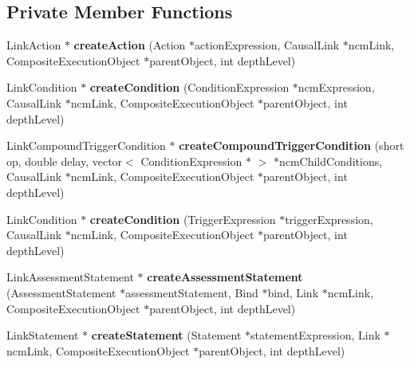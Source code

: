 \subsection*{Private Member Functions}
\begin{CompactItemize}
\item 
LinkAction $\ast$ \textbf{createAction} (Action $\ast$actionExpression, CausalLink $\ast$ncmLink, CompositeExecutionObject $\ast$parentObject, int depthLevel)\label{classbr_1_1pucrio_1_1telemidia_1_1ginga_1_1ncl_1_1emconverter_1_1FormatterLinkConverter_63db49c279704468f782e2a9b83de54d}

\item 
LinkCondition $\ast$ \textbf{createCondition} (ConditionExpression $\ast$ncmExpression, CausalLink $\ast$ncmLink, CompositeExecutionObject $\ast$parentObject, int depthLevel)\label{classbr_1_1pucrio_1_1telemidia_1_1ginga_1_1ncl_1_1emconverter_1_1FormatterLinkConverter_da854b17ddd9acc030a0a53d40ce6260}

\item 
LinkCompoundTriggerCondition $\ast$ \textbf{createCompoundTriggerCondition} (short op, double delay, vector$<$ ConditionExpression $\ast$ $>$ $\ast$ncmChildConditions, CausalLink $\ast$ncmLink, CompositeExecutionObject $\ast$parentObject, int depthLevel)\label{classbr_1_1pucrio_1_1telemidia_1_1ginga_1_1ncl_1_1emconverter_1_1FormatterLinkConverter_185f5305cff2da616f6261363806a1ee}

\item 
LinkCondition $\ast$ \textbf{createCondition} (TriggerExpression $\ast$triggerExpression, CausalLink $\ast$ncmLink, CompositeExecutionObject $\ast$parentObject, int depthLevel)\label{classbr_1_1pucrio_1_1telemidia_1_1ginga_1_1ncl_1_1emconverter_1_1FormatterLinkConverter_3c3316a7eafee557b9da46a021267489}

\item 
LinkAssessmentStatement $\ast$ \textbf{createAssessmentStatement} (AssessmentStatement $\ast$assessmentStatement, Bind $\ast$bind, Link $\ast$ncmLink, CompositeExecutionObject $\ast$parentObject, int depthLevel)\label{classbr_1_1pucrio_1_1telemidia_1_1ginga_1_1ncl_1_1emconverter_1_1FormatterLinkConverter_9badcb8fd283c88e817a455f2d01cba0}

\item 
LinkStatement $\ast$ \textbf{createStatement} (Statement $\ast$statementExpression, Link $\ast$ncmLink, CompositeExecutionObject $\ast$parentObject, int depthLevel)\label{classbr_1_1pucrio_1_1telemidia_1_1ginga_1_1ncl_1_1emconverter_1_1FormatterLinkConverter_dbfdc7eeda40396605436a113416d2c3}


\end{CompactItemize}
